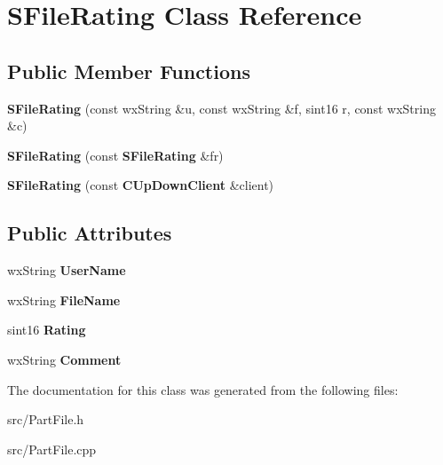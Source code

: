 \section{SFileRating Class Reference}
\label{classSFileRating}
\subsection*{Public Member Functions}
\begin{DoxyCompactItemize}
\item 
{\bfseries SFileRating} (const wxString \&u, const wxString \&f, sint16 r, const wxString \&c)\label{classSFileRating_a90a7c9079977216cf5f048daf96afef0}

\item 
{\bfseries SFileRating} (const {\bf SFileRating} \&fr)\label{classSFileRating_ab9b18f56719a8dfa73dd34f264fd55fa}

\item 
{\bfseries SFileRating} (const {\bf CUpDownClient} \&client)\label{classSFileRating_ab03335a988a444962e81f69113fb42c5}

\end{DoxyCompactItemize}
\subsection*{Public Attributes}
\begin{DoxyCompactItemize}
\item 
wxString {\bfseries UserName}\label{classSFileRating_ae092ec966f3ce7ef05a0d8e8e2cc5bf8}

\item 
wxString {\bfseries FileName}\label{classSFileRating_a3d0a807790eca84cdf12dac6a106d43a}

\item 
sint16 {\bfseries Rating}\label{classSFileRating_a0a943631ee2f7577d01e371beeadf431}

\item 
wxString {\bfseries Comment}\label{classSFileRating_a7bdb1df57f35f5535f3a99c67d29da26}

\end{DoxyCompactItemize}


The documentation for this class was generated from the following files:\begin{DoxyCompactItemize}
\item 
src/PartFile.h\item 
src/PartFile.cpp\end{DoxyCompactItemize}
